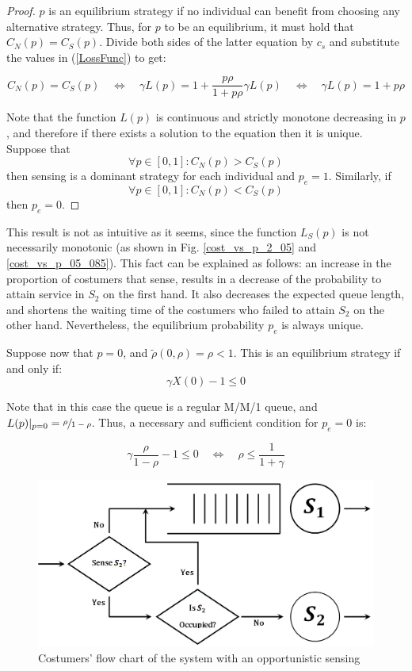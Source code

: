\documentclass[11pt]{article}
\numberwithin{equation}{section}
\begin{document}
\begin{proof}

$p$ is an equilibrium strategy if no individual can benefit from choosing any alternative strategy. Thus, for $p$ to be an equilibrium, it must hold that $C_{N}(p)=C_{S}(p)$. Divide both sides of the latter equation by $c_{s}$ and substitute the values in (\ref{LossFunc}) to get:

\[ C_{N}(p) = C_{S}(p) \quad\Leftrightarrow\quad \gamma L(p) = 1 + \frac{p \rho}{1 + p\rho} \gamma L(p) \quad\Leftrightarrow\quad \gamma L(p)=1+p\rho \]

Note that the function $L(p)$ is continuous and strictly monotone decreasing in $p$, and therefore if there exists a solution to the equation then it is unique. Suppose that \[\forall p \in [0,1]: C_{N}(p) > C_{S}(p)\] then sensing is a dominant strategy for each individual and $p_{e}=1$. Similarly, if \[\forall p \in [0,1]: C_{N}(p) < C_{S}(p)\] then $p_{e}=0$.

\end{proof}

This result is not as intuitive as it seems, since the function $L_{S}(p)$ is not necessarily monotonic (as shown in Fig. \ref{cost_vs_p_2_05} and \ref{cost_vs_p_05_085}). This fact can be explained as follows: an increase in the proportion of costumers that sense, results in a decrease of the probability to attain service in $S_{2}$ on the first hand. It also decreases the expected queue length, and shortens the waiting time of the costumers who failed to attain $S_{2}$ on the other hand. Nevertheless, the equilibrium probability $p_{e}$ is always unique.

Suppose now that $p=0$, and $\tilde{\rho}(0,\rho) = \rho < 1$. This is an equilibrium strategy if and only if:
\[ \gamma X(0)-1 \leq 0 \]

Note that in this case the queue is a regular M/M/1 queue, and $L(p)|_{p=0} = \sfrac{\rho}{1-\rho}$. Thus, a necessary and sufficient condition for $p_{e}=0$ is:

\[ \gamma \frac{\rho}{1-\rho}-1 \leq 0 \quad\Leftrightarrow\quad \rho \leq \frac{1}{1+\gamma} \]

\newpage
\begin{figure}[h!]
    \centering
    \includegraphics[width=1\textwidth]{Fig_1.png}
    \caption{Costumers' flow chart of the system with an opportunistic sensing}
    \label{CostumersFlow}
\end{figure}
\end{document}
